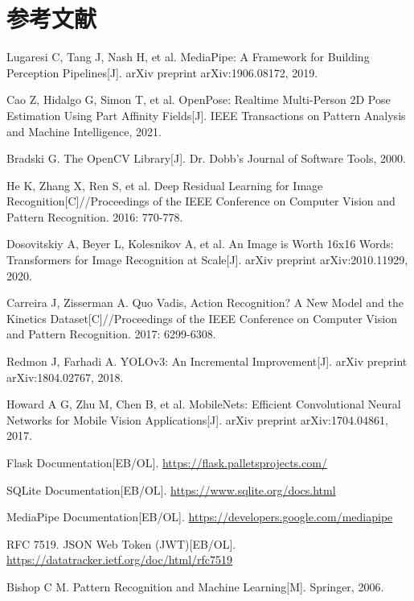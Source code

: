 \chapter*{参考文献}

{\songti{}
\noindent
\sloppy
\begin{chineseenum}[label=\arabic*.]
  \item Lugaresi C, Tang J, Nash H, et al. MediaPipe: A Framework for Building Perception Pipelines[J]. arXiv preprint arXiv:1906.08172, 2019.
  \item Cao Z, Hidalgo G, Simon T, et al. OpenPose: Realtime Multi-Person 2D Pose Estimation Using Part Affinity Fields[J]. IEEE Transactions on Pattern Analysis and Machine Intelligence, 2021.
  \item Bradski G. The OpenCV Library[J]. Dr. Dobb's Journal of Software Tools, 2000.
  \item He K, Zhang X, Ren S, et al. Deep Residual Learning for Image Recognition[C]//Proceedings of the IEEE Conference on Computer Vision and Pattern Recognition. 2016: 770-778.
  \item Dosovitskiy A, Beyer L, Kolesnikov A, et al. An Image is Worth 16x16 Words: Transformers for Image Recognition at Scale[J]. arXiv preprint arXiv:2010.11929, 2020.
  \item Carreira J, Zisserman A. Quo Vadis, Action Recognition? A New Model and the Kinetics Dataset[C]//Proceedings of the IEEE Conference on Computer Vision and Pattern Recognition. 2017: 6299-6308.
  \item Redmon J, Farhadi A. YOLOv3: An Incremental Improvement[J]. arXiv preprint arXiv:1804.02767, 2018.
  \item Howard A G, Zhu M, Chen B, et al. MobileNets: Efficient Convolutional Neural Networks for Mobile Vision Applications[J]. arXiv preprint arXiv:1704.04861, 2017.
  \item Flask Documentation[EB/OL]. \url{https://flask.palletsprojects.com/}
  \item SQLite Documentation[EB/OL]. \url{https://www.sqlite.org/docs.html}
  \item MediaPipe Documentation[EB/OL]. \url{https://developers.google.com/mediapipe}
  \item RFC 7519. JSON Web Token (JWT)[EB/OL]. \url{https://datatracker.ietf.org/doc/html/rfc7519}
  \item Bishop C M. Pattern Recognition and Machine Learning[M]. Springer, 2006.

\end{chineseenum}}
